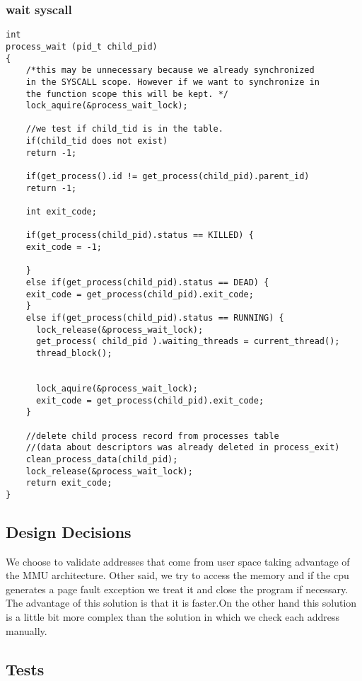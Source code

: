     \subsubsection{wait syscall}
    \vspace{-1em} %
    \begin{lstlisting}
int
process_wait (pid_t child_pid) 
{
    /*this may be unnecessary because we already synchronized
    in the SYSCALL scope. However if we want to synchronize in
    the function scope this will be kept. */
    lock_aquire(&process_wait_lock);
    
    //we test if child_tid is in the table.
    if(child_tid does not exist) 
	return -1;

    if(get_process().id != get_process(child_pid).parent_id)
	return -1;

    int exit_code;

    if(get_process(child_pid).status == KILLED) {
	exit_code = -1;
	
    }
    else if(get_process(child_pid).status == DEAD) {
	exit_code = get_process(child_pid).exit_code;            
    }
    else if(get_process(child_pid).status == RUNNING) {
      lock_release(&process_wait_lock);
      get_process( child_pid ).waiting_threads = current_thread();
      thread_block();


      lock_aquire(&process_wait_lock);
      exit_code = get_process(child_pid).exit_code;
    }

    //delete child process record from processes table 
    //(data about descriptors was already deleted in process_exit)
    clean_process_data(child_pid);
    lock_release(&process_wait_lock);
    return exit_code;
}
    \end{lstlisting}


    \subsection{Design Decisions}

	We choose to validate addresses that come from user space taking advantage of the MMU architecture. Other said, we try to access the memory and if the cpu generates a page fault exception we treat it and close the program if necessary. The advantage of this solution is that it is faster.On the other hand this solution is a little bit more complex than the solution in which we check each address manually.

    \subsection{Tests}

